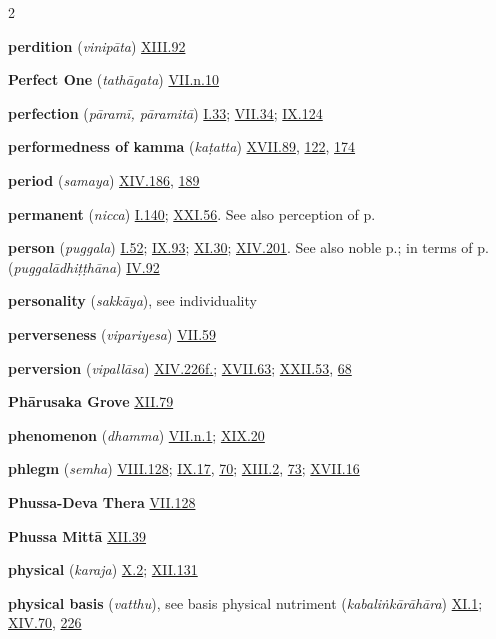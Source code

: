 \begin{multicols}{2}
\begin{vismHanging}
\par\textbf{perdition} (\emph{vinipāta}) \hyperlink{XIII.92}{XIII.92}{}
\par\textbf{Perfect One} (\emph{tathāgata}) \hyperlink{VII.n10}{VII.n.10}{}
\par\textbf{perfection} (\emph{pāramī, pāramitā}) \hyperlink{I.33}{I.33}{}; \hyperlink{VII.34}{VII.34}{}; \hyperlink{IX.124}{IX.124}{}
\par\textbf{performedness of kamma} (\emph{kaṭatta}) \hyperlink{XVII.89}{XVII.89}{}, \hyperlink{XVII.122}{122}{}, \hyperlink{XVII.174}{174}{}
\par\textbf{period} (\emph{samaya}) \hyperlink{XIV.186}{XIV.186}{}, \hyperlink{XIV.189}{189}{}
\par\textbf{permanent} (\emph{nicca}) \hyperlink{I.140}{I.140}{}; \hyperlink{XXI.56}{XXI.56}{}. See also perception of p. 
\par\textbf{person} (\emph{puggala}) \hyperlink{I.52}{I.52}{}; \hyperlink{IX.93}{IX.93}{}; \hyperlink{XI.30}{XI.30}{}; \hyperlink{XIV.201}{XIV.201}{}. See also noble p.; in terms of p. (\emph{puggalādhiṭṭhāna}) \hyperlink{IV.92}{IV.92}{}
\par\textbf{personality} (\emph{sakkāya}), see individuality
\par\textbf{perverseness} (\emph{vipariyesa}) \hyperlink{VII.59}{VII.59}{}
\par\textbf{perversion} (\emph{vipallāsa}) \hyperlink{XIV.226}{XIV.226f.}{}; \hyperlink{XVII.63}{XVII.63}{}; \hyperlink{XXII.53}{XXII.53}{}, \hyperlink{XXII.68}{68}{}
\par\textbf{Phārusaka Grove} \hyperlink{XII.79}{XII.79}{}
\par\textbf{phenomenon} (\emph{dhamma}) \hyperlink{VII.n1}{VII.n.1}{}; \hyperlink{XIX.20}{XIX.20}{}
\par\textbf{phlegm} (\emph{semha}) \hyperlink{VIII.128}{VIII.128}{}; \hyperlink{IX.17}{IX.17}{}, \hyperlink{IX.70}{70}{}; \hyperlink{XIII.2}{XIII.2}{}, \hyperlink{XIII.73}{73}{}; \hyperlink{XVII.16}{XVII.16}{}
\par\textbf{Phussa-Deva Thera} \hyperlink{VII.128}{VII.128}{}
\par\textbf{Phussa Mittā} \hyperlink{XII.39}{XII.39}{}
\par\textbf{physical} (\emph{karaja}) \hyperlink{X.2}{X.2}{}; \hyperlink{XII.131}{XII.131}{}
\par\textbf{physical basis} (\emph{vatthu}), see basis physical nutriment (\emph{kabaliṅkārāhāra}) \hyperlink{XI.1}{XI.1}{}; \hyperlink{XIV.70}{XIV.70}{}, \hyperlink{XIV.226}{226}{}

\end{vismHanging}
\end{multicols}
